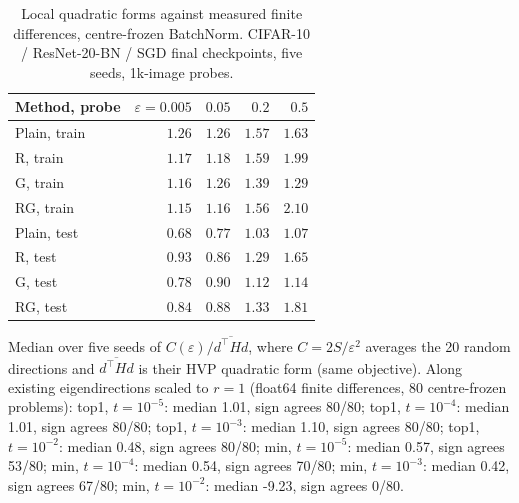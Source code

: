 \begin{table}[!t]
\caption{Local quadratic forms against measured finite differences, centre-frozen BatchNorm. CIFAR-10 / ResNet-20-BN / SGD final checkpoints, five seeds, 1k-image probes.}\label{tab:geometry-amplitude}
\centering\small\setlength{\tabcolsep}{4pt}\renewcommand{\arraystretch}{1.08}
\begin{tabular*}{\linewidth}{@{\extracolsep{\fill}}lrrrr@{}}
\toprule
Method, probe & $\varepsilon=0.005$ & $0.05$ & $0.2$ & $0.5$\\
\midrule
Plain, train & $1.26$ & $1.26$ & $1.57$ & $1.63$\\
R, train & $1.17$ & $1.18$ & $1.59$ & $1.99$\\
G, train & $1.16$ & $1.26$ & $1.39$ & $1.29$\\
RG, train & $1.15$ & $1.16$ & $1.56$ & $2.10$\\
Plain, test & $0.68$ & $0.77$ & $1.03$ & $1.07$\\
R, test & $0.93$ & $0.86$ & $1.29$ & $1.65$\\
G, test & $0.78$ & $0.90$ & $1.12$ & $1.14$\\
RG, test & $0.84$ & $0.88$ & $1.33$ & $1.81$\\
\bottomrule
\end{tabular*}
\par\smallskip\begin{minipage}{\linewidth}\footnotesize Median over five seeds of $C(\varepsilon)/\overline{d^\top Hd}$, where $C=2S/\varepsilon^2$ averages the 20 random directions and $\overline{d^\top Hd}$ is their HVP quadratic form (same objective). Along existing eigendirections scaled to $r=1$ (float64 finite differences, 80 centre-frozen problems): top1, $t=10^{-5}$: median 1.01, sign agrees 80/80; top1, $t=10^{-4}$: median 1.01, sign agrees 80/80; top1, $t=10^{-3}$: median 1.10, sign agrees 80/80; top1, $t=10^{-2}$: median 0.48, sign agrees 80/80; min, $t=10^{-5}$: median 0.57, sign agrees 53/80; min, $t=10^{-4}$: median 0.54, sign agrees 70/80; min, $t=10^{-3}$: median 0.42, sign agrees 67/80; min, $t=10^{-2}$: median -9.23, sign agrees 0/80.\end{minipage}
\end{table}
